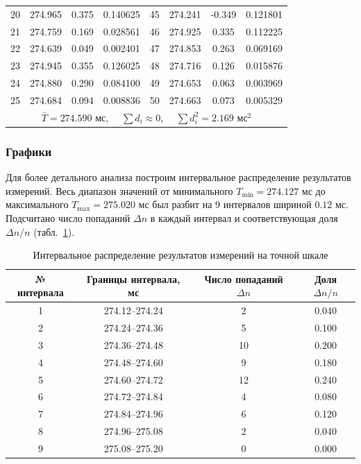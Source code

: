 \begin{table}[H]
\begin{tabular}{|c|c|c|c||c|c|c|c|}
20 & 274.965 & 0.375 & 0.140625 & 45 & 274.241 & -0.349 & 0.121801 \\
21 & 274.759 & 0.169 & 0.028561 & 46 & 274.925 & 0.335 & 0.112225 \\
22 & 274.639 & 0.049 & 0.002401 & 47 & 274.853 & 0.263 & 0.069169 \\
23 & 274.945 & 0.355 & 0.126025 & 48 & 274.716 & 0.126 & 0.015876 \\
24 & 274.880 & 0.290 & 0.084100 & 49 & 274.653 & 0.063 & 0.003969 \\
25 & 274.684 & 0.094 & 0.008836 & 50 & 274.663 & 0.073 & 0.005329 \\
\hline
\multicolumn{8}{|c|}{ $\bar{T} = 274.590$ мс, $\quad \sum d_i \approx 0$, $\quad \sum d_i^2 = 2.169$ $\text{мс}^2$ } \\
\hline
\end{tabular}
\end{table}

\subsubsection{Графики}
Для более детального анализа построим интервальное распределение результатов измерений. Весь диапазон значений от минимального \(T_{\min}=274.127\) мс до максимального \(T_{\max}=275.020\) мс был разбит на 9 интервалов шириной \(0.12\) мс. Подсчитано число попаданий \(\Delta n\) в каждый интервал и соответствующая доля \(\Delta n/n\) (табл.~\ref{tab:hist_dist}).

\begin{table}[H]
\centering
\caption{Интервальное распределение результатов измерений на точной шкале}
\label{tab:hist_dist}
\begin{tabular}{|c|c|c|c|}
\hline
№ интервала & Границы интервала, мс & Число попаданий \(\Delta n\) & Доля \(\Delta n / n\) \\
\hline
1 & 274.12--274.24 & 2 & 0.040 \\
2 & 274.24--274.36 & 5 & 0.100 \\
3 & 274.36--274.48 & 10 & 0.200 \\
4 & 274.48--274.60 & 9 & 0.180 \\
5 & 274.60--274.72 & 12 & 0.240 \\
6 & 274.72--274.84 & 4 & 0.080 \\
7 & 274.84--274.96 & 6 & 0.120 \\
8 & 274.96--275.08 & 2 & 0.040 \\
9 & 275.08--275.20 & 0 & 0.000 \\
\hline
\end{tabular}
\end{table}

